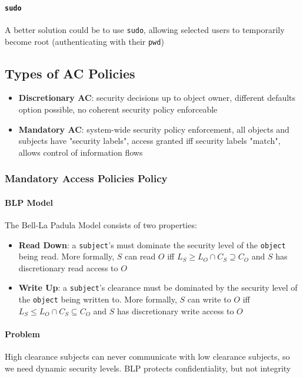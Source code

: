 \paragraph{\texttt{sudo}} A better solution could be to use \texttt{sudo}, allowing selected users to temporarily become root (authenticating with their \texttt{pwd})

\subsection{Types of AC Policies}
\begin{itemize}
    \item \textbf{Discretionary AC}: security decisions up to object owner, different defaults option possible, no coherent security policy enforceable
    \item \textbf{Mandatory AC}: system-wide security policy enforcement, all objects and subjects have "security labels", access granted iff security labels "match", allows control of information flows
\end{itemize}


\subsubsection{Mandatory Access Policies Policy}
\paragraph{BLP Model}
The Bell-La Padula Model consists of two properties:
\begin{itemize}
    \item \textbf{Read Down}: a \texttt{subject}'s must dominate the security level of the \texttt{object} being read. More formally, $S$ can read $O$ iff $L_S \geq L_O \cap C_S \supseteq C_O$ and $S$ has discretionary read access to $O$
    \item \textbf{Write Up}: a \texttt{subject}'s clearance must be dominated by the security level of the \texttt{object} being written to. More formally, $S$ can write to $O$ iff $L_S \leq L_O \cap C_S \subseteq C_O$ and $S$ has discretionary write access to $O$
\end{itemize}

\paragraph{Problem} High clearance subjects can never communicate with low clearance subjects, so we need dynamic security levels. BLP protects confidentiality, but not integrity

